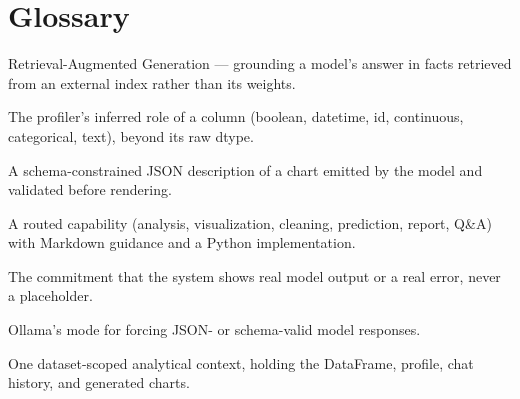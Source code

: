 \section{Glossary}
\label{app:glossary}
\begin{description}[style=nextline,leftmargin=0pt,itemsep=3pt]
  \item[\textcolor{uaIndigoD}{RAG}] Retrieval-Augmented Generation --- grounding a
    model's answer in facts retrieved from an external index rather than its
    weights.
  \item[\textcolor{uaIndigoD}{Semantic type}] The profiler's inferred role of a
    column (boolean, datetime, id, continuous, categorical, text), beyond its raw
    dtype.
  \item[\textcolor{uaIndigoD}{Chart plan}] A schema-constrained JSON description
    of a chart emitted by the model and validated before rendering.
  \item[\textcolor{uaIndigoD}{Skill}] A routed capability (analysis,
    visualization, cleaning, prediction, report, Q\&A) with Markdown guidance and
    a Python implementation.
  \item[\textcolor{uaIndigoD}{No-fabrication rule}] The commitment that the system
    shows real model output or a real error, never a placeholder.
  \item[\textcolor{uaIndigoD}{Structured output}] Ollama's mode for forcing
    JSON- or schema-valid model responses.
  \item[\textcolor{uaIndigoD}{Session}] One dataset-scoped analytical context,
    holding the DataFrame, profile, chat history, and generated charts.
\end{description}

\vfill
\begin{center}
\end{center}
